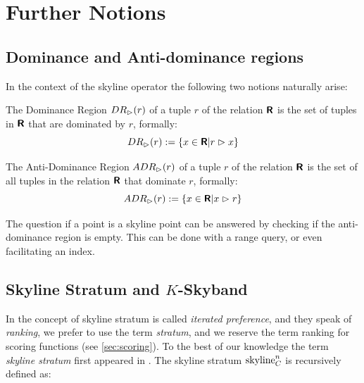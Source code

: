 %
%

\section{Further Notions}
\subsection{Dominance and Anti-dominance regions}
In the context of the skyline operator the following two notions naturally
arise:

\begin{definition}
The Dominance Region $DR_\vartriangleright(r)$ of a tuple $r$ of the relation
$\textnormal{\bf\textsf{R}}$ is the set of tuples in $\textnormal{\bf\textsf{R}}$ that are dominated
by $r$, formally:
\[
DR_\vartriangleright(r) := \{ x \in \textnormal{\bf\textsf{R}} | r \vartriangleright x \}
\]
\end{definition}

\begin{definition}
The Anti-Dominance Region $ADR_\vartriangleright(r)$ of a tuple $r$ of the
relation $\textnormal{\bf\textsf{R}}$ is the set of all tuples in the relation $\textnormal{\bf\textsf{R}}$
that dominate $r$, formally:
\[
ADR_\vartriangleright(r) := \{ x \in \textnormal{\bf\textsf{R}} | x \vartriangleright r \}
\]
\end{definition}

The question if a point is a skyline point can be answered by checking
if the anti-dominance region is empty.  This can be done with a range
query, or even facilitating an index.

\subsection{Skyline Stratum and $K$-Skyband}
\label{sec:skyline-stratum}
In \citep{Chomicki2003a} the concept of skyline stratum is called
\emph{iterated preference}, and they speak of 
\emph{ranking}, we prefer to use the term
\emph{stratum}, and we reserve the term ranking for
scoring functions (see \autoref{sec:scoring}).
To the best of our knowledge the term \emph{skyline stratum} first 
appeared in \citep{Chan2005}.
The  skyline stratum $\skyline_C^n$ is recursively defined as:

